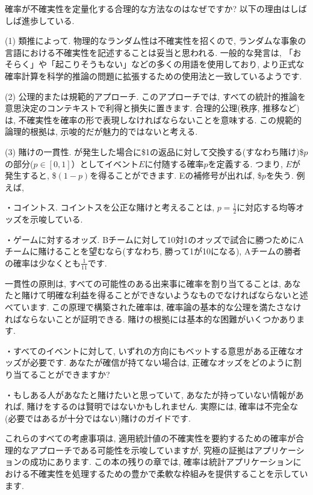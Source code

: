 \documentclass[10pt,dvipdfmx,a4]{beamer}
\begin{document}
\begin{frame}
確率が不確実性を定量化する合理的な方法なのはなぜですか?
以下の理由はしばしば進歩している.

(1) 類推によって.
物理的なランダム性は不確実性を招くので, ランダムな事象の言語における不確実性を記述することは妥当と思われる.
一般的な発言は, 「おそらく」や「起こりそうもない」などの多くの用語を使用しており, より正式な確率計算を科学的推論の問題に拡張するための使用法と一致しているようです.

(2) 公理的または規範的アプローチ.
このアプローチでは, すべての統計的推論を意思決定のコンテキストで利得と損失に置きます.
合理的公理(秩序, 推移など)は, 不確実性を確率の形で表現しなければならないことを意味する.
この規範的論理的根拠は, 示唆的だが魅力的ではないと考える.

(3) 賭けの一貫性.
が発生した場合に\$1の返品に対して交換する(すなわち賭け)\$$p$の部分($p\in[0,1]$）としてイベント$E$に付随する確率$p$を定義する.
つまり, $E$が発生すると, \$$(1-p)$を得ることができます.
Eの補修号が出れば, \$$p$を失う.
例えば,

・コイントス.
コイントスを公正な賭けと考えることは, $p=\tfrac{1}{2}$に対応する均等オッズを示唆している.
\end{frame}


\begin{frame}
・ゲームに対するオッズ.
Bチームに対して10対1のオッズで試合に勝つためにAチームに賭けることを望むなら(すなわち, 勝って1が10になる), Aチームの勝者の確率は少なくとも$\tfrac{1}{11}$です.

一貫性の原則は, すべての可能性のある出来事に確率を割り当てることは, あなたと賭けて明確な利益を得ることができないようなものでなければならないと述べています.
この原理で構築された確率は, 確率論の基本的な公理を満たさなければならないことが証明できる.
賭けの根拠には基本的な困難がいくつかあります.

・すべてのイベントに対して, いずれの方向にもベットする意思がある正確なオッズが必要です.
あなたが確信が持てない場合は, 正確なオッズをどのように割り当てることができますか?

・もしある人があなたと賭けたいと思っていて, あなたが持っていない情報があれば, 賭けをするのは賢明ではないかもしれません.
実際には, 確率は不完全な(必要ではあるが十分ではない)賭けのガイドです.

これらのすべての考慮事項は, 適用統計値の不確実性を要約するための確率が合理的なアプローチである可能性を示唆していますが, 究極の証拠はアプリケーションの成功にあります.
この本の残りの章では, 確率は統計アプリケーションにおける不確実性を処理するための豊かで柔軟な枠組みを提供することを示しています.
\end{frame}
\end{document}
